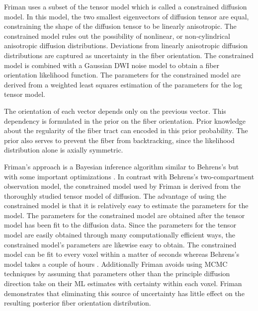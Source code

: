 \documentclass{InsightArticle}
\begin{document}
Friman uses a subset of the tensor model which is called a constrained diffusion model.  In this model, the two smallest eigenvectors of diffusion tensor are equal, constraining the shape of the diffusion tensor to be linearly anisotropic.  The constrained model rules out the possibility of nonlinear, or non-cylindrical anisotropic diffusion distributions.  Deviations from linearly anisotropic diffusion distributions are captured as uncertainty in the fiber orientation.  The constrained model is combined with a Gaussian DWI noise model to obtain a fiber orientation likelihood function.  The parameters for the constrained model are derived from a weighted least squares estimation of the parameters for the log tensor model.

The orientation of each vector depends only on the previous vector.  This dependency is formulated in the prior on the fiber orientation.  Prior knowledge about the regularity of the fiber tract can encoded in this prior probability.  The prior also serves to prevent the fiber from backtracking, since the likelihood distribution alone is axially symmetric.

Friman's approach is a Bayesian inference algorithm similar to Behrens's but with some important optimizations \cite{frimanTMI06}.  In contrast with Behrens's two-compartment observation model, the constrained model used by Friman is derived from the thoroughly studied tensor model of diffusion.  The advantage of using the constrained model is that it is relatively easy to estimate the parameters for the model.  The parameters for the constrained model are obtained after the tensor model has been fit to the diffusion data.  Since the parameters for the tensor model are easily obtained through many computationally efficient ways, the constrained model's parameters are likewise easy to obtain.  The constrained model can be fit to every voxel within a matter of seconds whereas Behrens's model takes a couple of hours \cite{frimanTMI06}.  Additionally Friman avoids using MCMC techniques by assuming that parameters other than the principle diffusion direction take on their ML estimates with certainty within each voxel.  Friman demonstrates that eliminating this source of uncertainty has little effect on the resulting posterior fiber orientation distribution.
\end{document}

